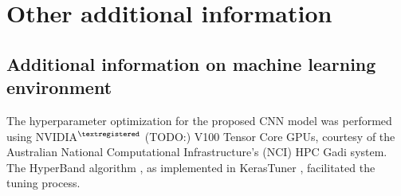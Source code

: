 
\section{Other additional information}

\subsection{Additional information on machine learning environment}

The hyperparameter optimization for the proposed CNN model was performed using NVIDIA$^{\textregistered}$ (TODO:) V100 Tensor Core GPUs, courtesy of the Australian National Computational Infrastructure's (NCI) HPC Gadi system. The HyperBand algorithm \cite{li2018hyperband}, as implemented in KerasTuner \cite{omalley2019kerastuner} , facilitated the tuning process.

